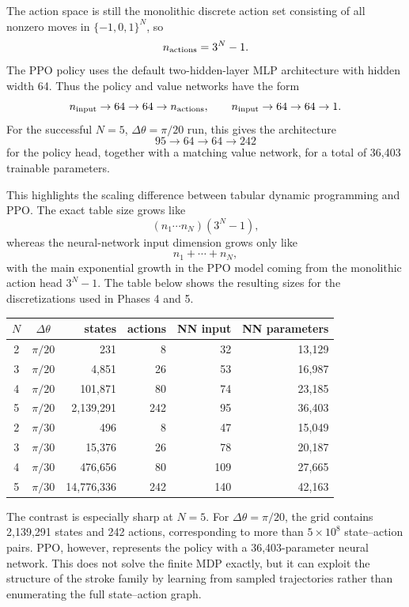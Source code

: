 \documentclass[11pt]{article}
\begin{document}
The action space is still the monolithic discrete action set consisting of all
nonzero moves in $\{-1,0,1\}^N$, so
\[
    n_{\rm actions}=3^N-1.
\]
The PPO policy uses the default two-hidden-layer MLP architecture with hidden
width 64. Thus the policy and value networks have the form
\[
    n_{\rm input} \to 64 \to 64 \to n_{\rm actions},
    \qquad
    n_{\rm input} \to 64 \to 64 \to 1.
\]
For the successful $N=5$, $\Delta\theta=\pi/20$ run, this gives the architecture
\[
    95 \to 64 \to 64 \to 242
\]
for the policy head, together with a matching value network, for a total of
36,403 trainable parameters.

This highlights the scaling difference between tabular dynamic programming and
PPO. The exact table size grows like
\[
    (n_1\cdots n_N)(3^N-1),
\]
whereas the neural-network input dimension grows only like
\[
    n_1+\cdots+n_N,
\]
with the main exponential growth in the PPO model coming from the monolithic
action head $3^N-1$. The table below shows the resulting sizes for the
discretizations used in Phases 4 and 5.

\begin{center}
\begin{tabular}{c c r r r r}
\toprule
$N$ & $\Delta\theta$ & states & actions & NN input & NN parameters \\
\midrule
2 & $\pi/20$ & 231 & 8 & 32 & 13,129 \\
3 & $\pi/20$ & 4,851 & 26 & 53 & 16,987 \\
4 & $\pi/20$ & 101,871 & 80 & 74 & 23,185 \\
5 & $\pi/20$ & 2,139,291 & 242 & 95 & 36,403 \\
\midrule
2 & $\pi/30$ & 496 & 8 & 47 & 15,049 \\
3 & $\pi/30$ & 15,376 & 26 & 78 & 20,187 \\
4 & $\pi/30$ & 476,656 & 80 & 109 & 27,665 \\
5 & $\pi/30$ & 14,776,336 & 242 & 140 & 42,163 \\
\bottomrule
\end{tabular}
\end{center}

The contrast is especially sharp at $N=5$. For $\Delta\theta=\pi/20$, the grid
contains 2,139,291 states and 242 actions, corresponding to more than
$5\times 10^8$ state--action pairs. PPO, however, represents the policy with a
36,403-parameter neural network. This does not solve the finite MDP exactly, but
it can exploit the structure of the stroke family by learning from sampled
trajectories rather than enumerating the full state--action graph.
\end{document}
